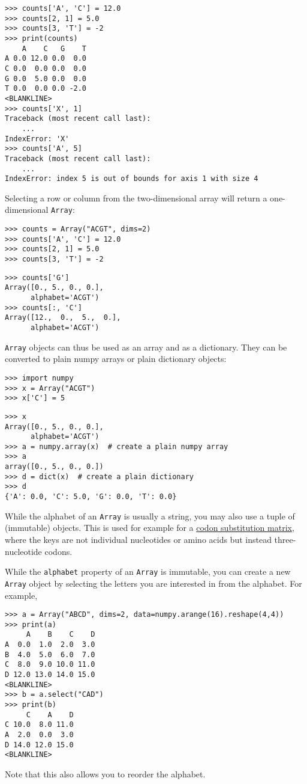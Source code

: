 \begin{verbatim}
>>> counts['A', 'C'] = 12.0
>>> counts[2, 1] = 5.0
>>> counts[3, 'T'] = -2
>>> print(counts)
    A    C   G    T
A 0.0 12.0 0.0  0.0
C 0.0  0.0 0.0  0.0
G 0.0  5.0 0.0  0.0
T 0.0  0.0 0.0 -2.0
<BLANKLINE>
>>> counts['X', 1]
Traceback (most recent call last):
    ...
IndexError: 'X'
>>> counts['A', 5]
Traceback (most recent call last):
    ...
IndexError: index 5 is out of bounds for axis 1 with size 4
\end{verbatim}
Selecting a row or column from the two-dimensional array will return a one-dimensional \verb+Array+:

\begin{verbatim}
>>> counts = Array("ACGT", dims=2)
>>> counts['A', 'C'] = 12.0
>>> counts[2, 1] = 5.0
>>> counts[3, 'T'] = -2
\end{verbatim}
\begin{verbatim}
>>> counts['G']
Array([0., 5., 0., 0.],
      alphabet='ACGT')
>>> counts[:, 'C']
Array([12.,  0.,  5.,  0.],
      alphabet='ACGT')
\end{verbatim}

\verb+Array+ objects can thus be used as an array and as a dictionary. They can be converted to plain numpy arrays or plain dictionary objects:

\begin{verbatim}
>>> import numpy
>>> x = Array("ACGT")
>>> x['C'] = 5
\end{verbatim}
\begin{verbatim}
>>> x
Array([0., 5., 0., 0.],
      alphabet='ACGT')
>>> a = numpy.array(x)  # create a plain numpy array
>>> a
array([0., 5., 0., 0.])
>>> d = dict(x)  # create a plain dictionary
>>> d
{'A': 0.0, 'C': 5.0, 'G': 0.0, 'T': 0.0}
\end{verbatim}

While the alphabet of an \verb+Array+ is usually a string, you may also use a tuple of (immutable) objects. This is used for example for a \hyperlink{codonmatrix}{codon substitution matrix}, where the keys are not individual nucleotides or amino acids but instead three-nucleotide codons.

While the \verb+alphabet+ property of an \verb+Array+ is immutable, you can create a new \verb+Array+ object by selecting the letters you are interested in from the alphabet. For example,
\begin{verbatim}
>>> a = Array("ABCD", dims=2, data=numpy.arange(16).reshape(4,4))
>>> print(a)
     A    B    C    D
A  0.0  1.0  2.0  3.0
B  4.0  5.0  6.0  7.0
C  8.0  9.0 10.0 11.0
D 12.0 13.0 14.0 15.0
<BLANKLINE>
>>> b = a.select("CAD")
>>> print(b)
     C    A    D
C 10.0  8.0 11.0
A  2.0  0.0  3.0
D 14.0 12.0 15.0
<BLANKLINE>
\end{verbatim}
Note that this also allows you to reorder the alphabet.


